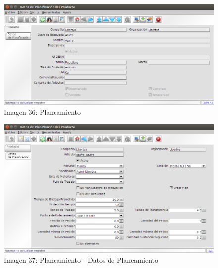 \documentclass[letterpaper,10pt,spanish]{sphinxmanual}
\begin{document}
\begin{figure}[htbp]
\centering
\capstart

\includegraphics{ly_planeam_1.png}
\caption{Imagen 36: Planeamiento}\end{figure}
\begin{figure}[htbp]
\centering
\capstart

\includegraphics{ly_planeam_2.png}
\caption{Imagen 37: Planeamiento - Datos de Planeamiento}\end{figure}
\end{document}
